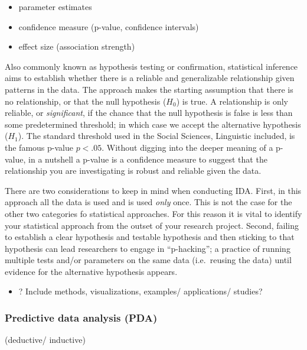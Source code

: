 \documentclass[
]{article}
\providecommand{\tightlist}{%
  \setlength{\itemsep}{0pt}\setlength{\parskip}{0pt}}
\begin{document}
\begin{itemize}
\tightlist
\item
  parameter estimates
\item
  confidence measure (p-value, confidence intervals)
\item
  effect size (association strength)
\end{itemize}

Also commonly known as hypothesis testing or confirmation, statistical inference aims to establish whether there is a reliable and generalizable relationship given patterns in the data. The approach makes the starting assumption that there is no relationship, or that the null hypothesis (\(H_0\)) is true. A relationship is only reliable, or \emph{significant}, if the chance that the null hypothesis is false is less than some predetermined threshold; in which case we accept the alternative hypothesis (\(H_1\)). The standard threshold used in the Social Sciences, Linguistic included, is the famous p-value \(p < .05\). Without digging into the deeper meaning of a p-value, in a nutshell a p-value is a confidence measure to suggest that the relationship you are investigating is robust and reliable given the data.

There are two considerations to keep in mind when conducting IDA. First, in this approach all the data is used and is used \emph{only} once. This is not the case for the other two categories fo statistical approaches. For this reason it is vital to identify your statistical approach from the outset of your research project. Second, failing to establish a clear hypothesis and testable hypothesis and then sticking to that hypothesis can lead researchers to engage in ``p-hacking''; a practice of running multiple tests and/or parameters on the same data (i.e.~reusing the data) until evidence for the alternative hypothesis appears.

\begin{itemize}
\tightlist
\item
  ? Include methods, visualizations, examples/ applications/ studies?
\end{itemize}

\hypertarget{predictive-data-analysis-pda}{%
\subsubsection{Predictive data analysis (PDA)}\label{predictive-data-analysis-pda}}

(deductive/ inductive)
\end{document}
